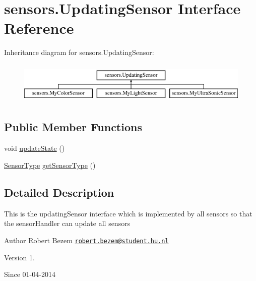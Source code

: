 \hypertarget{interfacesensors_1_1_updating_sensor}{\section{sensors.\-Updating\-Sensor Interface Reference}
\label{interfacesensors_1_1_updating_sensor}
}
Inheritance diagram for sensors.\-Updating\-Sensor\-:\begin{figure}[H]
\begin{center}
\leavevmode
\includegraphics[height=2.000000cm]{interfacesensors_1_1_updating_sensor}
\end{center}
\end{figure}
\subsection*{Public Member Functions}
\begin{DoxyCompactItemize}
\item 
void \hyperlink{interfacesensors_1_1_updating_sensor_ac0b2a4f75f4a0e0f121a1aa6150d93a6}{update\-State} ()
\item 
\hyperlink{enumsensors_1_1_sensor_type}{Sensor\-Type} \hyperlink{interfacesensors_1_1_updating_sensor_aecdbf523b2bfe67a125b5587f71c4cf1}{get\-Sensor\-Type} ()
\end{DoxyCompactItemize}


\subsection{Detailed Description}
This is the updating\-Sensor interface which is implemented by all sensors so that the sensor\-Handler can update all sensors

\begin{DoxyAuthor}{Author}
Robert Bezem \href{mailto:robert.bezem@student.hu.nl}{\tt robert.\-bezem@student.\-hu.\-nl} 
\end{DoxyAuthor}
\begin{DoxyVersion}{Version}
1. 
\end{DoxyVersion}
\begin{DoxySince}{Since}
01-\/04-\/2014 
\end{DoxySince}


